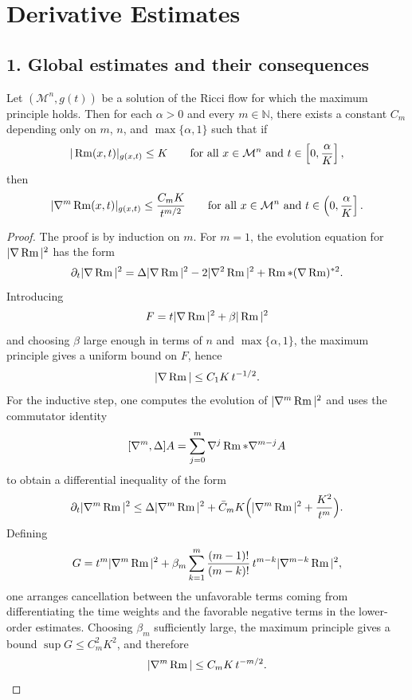 \chapter{Derivative Estimates}

\section*{1. Global estimates and their consequences}

\begin{theorem}
\label{ch07-thm-global-derivative-estimates}
Let \((\mathcal M^n,g(t))\) be a solution of the Ricci flow for which the maximum principle holds. Then for each \(\alpha>0\) and every \(m\in\mathbb N\), there exists a constant \(C_m\) depending only on \(m\), \(n\), and \(\max\{\alpha,1\}\) such that if
\[
|\operatorname{Rm}(x,t)|_{g(x,t)}\le K
\qquad\text{for all }x\in \mathcal M^n\text{ and }t\in\left[0,\frac{\alpha}{K}\right],
\]
then
\[
|\nabla^m \operatorname{Rm}(x,t)|_{g(x,t)}\le \frac{C_m K}{t^{m/2}}
\qquad\text{for all }x\in \mathcal M^n\text{ and }t\in\left(0,\frac{\alpha}{K}\right].
\]
\end{theorem}

\begin{proof}
The proof is by induction on \(m\). For \(m=1\), the evolution equation for \(|\nabla \operatorname{Rm}|^2\) has the form
\[
\partial_t |\nabla \operatorname{Rm}|^2=\Delta |\nabla \operatorname{Rm}|^2-2|\nabla^2\operatorname{Rm}|^2+\operatorname{Rm}*(\nabla\operatorname{Rm})^{*2}.
\]
Introducing
\[
F=t|\nabla \operatorname{Rm}|^2+\beta |\operatorname{Rm}|^2
\]
and choosing \(\beta\) large enough in terms of \(n\) and \(\max\{\alpha,1\}\), the maximum principle gives a uniform bound on \(F\), hence
\[
|\nabla \operatorname{Rm}|\le C_1K\,t^{-1/2}.
\]
For the inductive step, one computes the evolution of \(|\nabla^m\operatorname{Rm}|^2\) and uses the commutator identity
\[
[\nabla^m,\Delta]A=\sum_{j=0}^m \nabla^j\operatorname{Rm}*\nabla^{m-j}A
\]
to obtain a differential inequality of the form
\[
\partial_t |\nabla^m\operatorname{Rm}|^2
\le \Delta |\nabla^m\operatorname{Rm}|^2+\bar C_m K\Bigl(|\nabla^m\operatorname{Rm}|^2+\frac{K^2}{t^m}\Bigr).
\]
Defining
\[
G=t^m|\nabla^m\operatorname{Rm}|^2+\beta_m \sum_{k=1}^m \frac{(m-1)!}{(m-k)!}\,t^{m-k}|\nabla^{m-k}\operatorname{Rm}|^2,
\]
one arranges cancellation between the unfavorable terms coming from differentiating the time weights and the favorable negative terms in the lower-order estimates. Choosing \(\beta_m\) sufficiently large, the maximum principle gives a bound \(\sup G\le C_m^2K^2\), and therefore
\[
|\nabla^m\operatorname{Rm}|\le C_mK\,t^{-m/2}.
\]
\end{proof}

